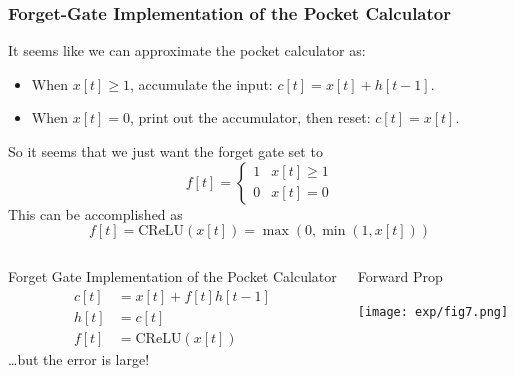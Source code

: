 \documentclass{beamer}
\begin{document}
\begin{frame}
  \frametitle{Forget-Gate Implementation of the Pocket Calculator}

  It seems like we can approximate the pocket calculator as:
  \begin{itemize}
  \item When $x[t]\ge 1$, accumulate the input: $c[t]=x[t]+h[t-1]$.
  \item When $x[t]=0$, print out the accumulator, then reset: $c[t]=x[t]$.
  \end{itemize}
  So it seems that we just want the forget gate set to
  \[
  f[t]=\left\{\begin{array}{ll}
  1 & x[t]\ge 1\\
  0 & x[t]=0
  \end{array}\right.
  \]
  This can be accomplished as
  \[
  f[t]=\mbox{CReLU}\left(x[t]\right)=\max\left(0,\min\left(1,x[t]\right)\right)
  \]
\end{frame}

\begin{frame}
  \begin{columns}
    \column{2in}
    \begin{block}{Forget Gate Implementation of the Pocket Calculator}
      \begin{align*}
        c[t] &= x[t]+f[t]h[t-1]\\
        h[t] &= c[t]\\
        f[t] &= \mbox{CReLU}\left(x[t]\right)
      \end{align*}
      \ldots but the error is large!
    \end{block}
    \column{2.25in}
    \begin{block}{Forward Prop}
      \centerline{\texttt{[image: exp/fig7.png]}}
    \end{block}
    \end{columns}
\end{frame}

\end{document}
